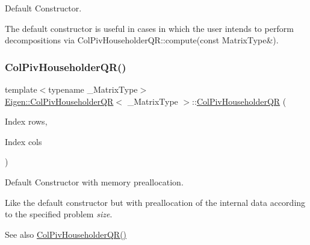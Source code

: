 Default Constructor. 

The default constructor is useful in cases in which the user intends to perform decompositions via Col\+Piv\+Householder\+Q\+R\+::compute(const Matrix\+Type\&). \mbox{\label{class_eigen_1_1_col_piv_householder_q_r_a5965d4fdebc04b2df71d67ff0b2d0c2c}} 
\subsubsection{\texorpdfstring{ColPivHouseholderQR()}{ColPivHouseholderQR()}\hspace{0.1cm}{\footnotesize\ttfamily [2/4]}}
{\footnotesize\ttfamily template$<$typename \+\_\+\+Matrix\+Type$>$ \\
\mbox{\hyperlink{class_eigen_1_1_col_piv_householder_q_r}{Eigen\+::\+Col\+Piv\+Householder\+QR}}$<$ \+\_\+\+Matrix\+Type $>$\+::\mbox{\hyperlink{class_eigen_1_1_col_piv_householder_q_r}{Col\+Piv\+Householder\+QR}} (\begin{DoxyParamCaption}\item[{Index}]{rows,  }\item[{Index}]{cols }\end{DoxyParamCaption})\hspace{0.3cm}{\ttfamily [inline]}}



Default Constructor with memory preallocation. 

Like the default constructor but with preallocation of the internal data according to the specified problem {\itshape size}. \begin{DoxySeeAlso}{See also}
\mbox{\hyperlink{class_eigen_1_1_col_piv_householder_q_r_a9d8a92c2a2f0debe5454812372237ed4}{Col\+Piv\+Householder\+Q\+R()}} 
\end{DoxySeeAlso}
\mbox{\label{class_eigen_1_1_col_piv_householder_q_r_a1aa6a5b95380df0ceb224cb833316d4f}} 
